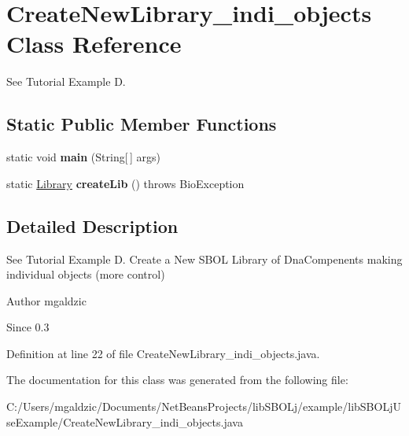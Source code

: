 \hypertarget{classlib_s_b_o_lj_use_example_1_1_create_new_library__indi__objects}{
\section{CreateNewLibrary\_\-indi\_\-objects Class Reference}
\label{classlib_s_b_o_lj_use_example_1_1_create_new_library__indi__objects}
}


See Tutorial Example D.  


\subsection*{Static Public Member Functions}
\begin{DoxyCompactItemize}
\item 
\hypertarget{classlib_s_b_o_lj_use_example_1_1_create_new_library__indi__objects_a8b260eecbaabcef8473fd87ada040682}{
static void {\bfseries main} (String\mbox{[}$\,$\mbox{]} args)}
\label{classlib_s_b_o_lj_use_example_1_1_create_new_library__indi__objects_a8b260eecbaabcef8473fd87ada040682}

\item 
\hypertarget{classlib_s_b_o_lj_use_example_1_1_create_new_library__indi__objects_a741f4a5b3c58900b684c7e424a72be76}{
static \hyperlink{classorg_1_1sbolstandard_1_1lib_s_b_o_lj_1_1_library}{Library} {\bfseries createLib} ()  throws BioException }
\label{classlib_s_b_o_lj_use_example_1_1_create_new_library__indi__objects_a741f4a5b3c58900b684c7e424a72be76}

\end{DoxyCompactItemize}


\subsection{Detailed Description}
See Tutorial Example D. Create a New SBOL Library of DnaCompenents making individual objects (more control) \begin{DoxyAuthor}{Author}
mgaldzic 
\end{DoxyAuthor}
\begin{DoxySince}{Since}
0.3 
\end{DoxySince}


Definition at line 22 of file CreateNewLibrary\_\-indi\_\-objects.java.



The documentation for this class was generated from the following file:\begin{DoxyCompactItemize}
\item 
C:/Users/mgaldzic/Documents/NetBeansProjects/libSBOLj/example/libSBOLjUseExample/CreateNewLibrary\_\-indi\_\-objects.java\end{DoxyCompactItemize}
